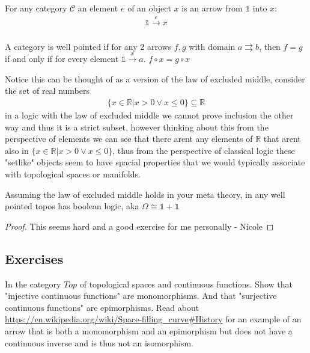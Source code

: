 \begin{definition}[Elements]
    For any category $\mathcal{C}$ an element $e$ of an object $x$ is an arrow from $\mathbb{1}$ into $x$:
    \begin{align*}
        \mathbb{1} \xrightarrow[]{e} x
    \end{align*}
\end{definition}
\begin{definition}
    A category is well pointed if for any 2 arrows $f,g$ with domain $a \rightrightarrows b$, then $f=g$ if and only if for every element $\mathbb{1} \xrightarrow{x} a$. $f \circ x = g \circ x$
\end{definition}
Notice this can be thought of as a version of the law of excluded middle, consider the set of real numbers
\begin{align*}
    \{x \in \mathbb{R} | x>0 \vee x \leq 0\} \subseteq \mathbb{R}
\end{align*}
in a logic with the law of excluded middle we cannot prove inclusion the other way and thus it is a strict subset, however thinking about this from the perspective of elements we can see that there arent any elements of $\mathbb{R}$ that arent also in $\{x \in \mathbb{R} | x>0 \vee x \leq 0\} $, thus from the perspective of classical logic these "setlike" objects seem to have spacial properties that we would typically associate with topological spaces or manifolds.

\begin{theorem}
    Assuming the law of excluded middle holds in your meta theory, in any well pointed topos has boolean logic, aka $\Omega \cong \mathbb{1}+\mathbb{1}$
\end{theorem}
\begin{proof}
    This seems hard and a good exercise for me personally - Nicole
\end{proof}


\subsection{Exercises}

\begin{Exercise}
    \begin{tasks}
        \task In the category $Top$ of topological spaces and continuous functions. Show that "injective continuous functions" are monomorphisms. And that "surjective continuous functions" are epimorphisms.
        \task Read about \url{https://en.wikipedia.org/wiki/Space-filling_curve#History} for an example of an arrow that is both a monomorphism and an epimorphism but does not have a continuous inverse and is thus not an isomorphism.
    \end{tasks}
\end{Exercise}


